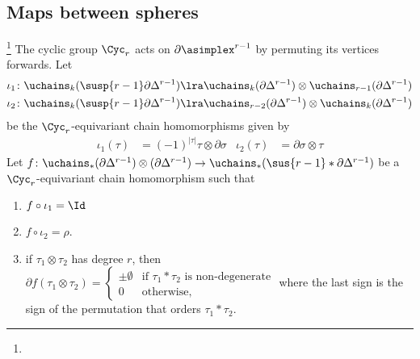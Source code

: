 \subsection{Maps between spheres}\label{section:sphere_maps}
\footnote{}
 The cyclic group $\Cyc_r$ acts on $\partial \asimplex^{r-1}$ by permuting its vertices forwards. Let
\begin{align*}
	\iota_1\colon \uchains_k(\susp{r-1}\partial \Delta^{r-1})&\lra \uchains_{k}(\partial\Delta^{r-1})\otimes \uchains_{r-1}(\partial\Delta^{r-1})\\
	\iota_2\colon \uchains_k(\susp{r-1}\partial \Delta^{r-1})&\lra \uchains_{r-2}(\partial\Delta^{r-1})\otimes \uchains_{k}(\partial\Delta^{r-1})
\end{align*}
be the $\Cyc_r$-equivariant chain homomorphisms given by
\begin{align*}
	\iota_1(\tau) &= (-1)^{|\tau|}\tau\otimes \partial \sigma &
	\iota_2(\tau) &= \partial \sigma\otimes \tau
\end{align*}
Let $f\colon \uchains_*(\partial\Delta^{r-1})\otimes(\partial\Delta^{r-1})\to \uchains_*(\sus{r-1}*\partial\Delta^{r-1})$ be a $\Cyc_r$-equivariant chain homomorphism such that
\renewcommand{\theenumi}{\roman{enumi}}
\begin{enumerate}
	\item\label{cond:1} $f\circ \iota_1 = \Id$
	\item\label{cond:2} $f\circ \iota_2 = \rho$.
	\item\label{cond:3} if $\tau_1\otimes\tau_2$ has degree $r$, then $ \partial f(\tau_1\otimes\tau_2) =
	\begin{cases}
	\pm\emptyset & \text{if $\tau_1* \tau_2$ is non-degenerate} \\
	0 & \text{otherwise},
	\end{cases}$
 where the last sign is the sign of the permutation that orders $\tau_1*\tau_2$.
\end{enumerate}

